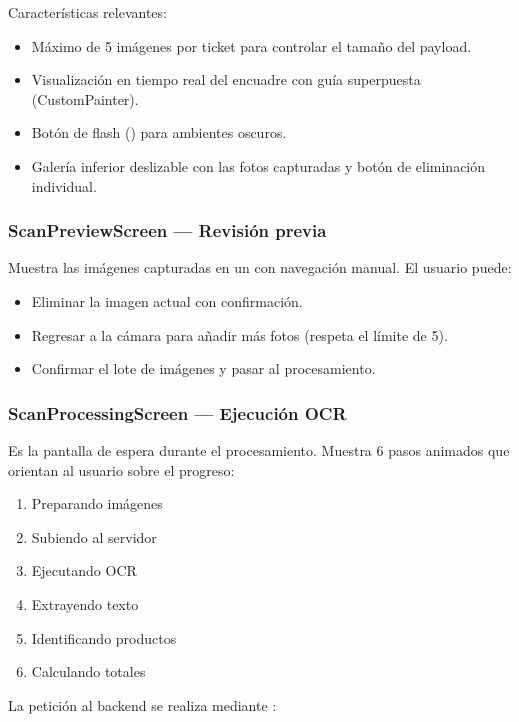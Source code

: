 Características relevantes:

\begin{itemize}
  \item Máximo de 5 imágenes por ticket para controlar el tamaño del
        payload.
  \item Visualización en tiempo real del encuadre con guía superpuesta
        (CustomPainter).
  \item Botón de flash () para ambientes oscuros.
  \item Galería inferior deslizable con las fotos capturadas y botón de
        eliminación individual.
\end{itemize}

\subsubsection*{ScanPreviewScreen — Revisión previa}

Muestra las imágenes capturadas en un  con navegación
manual. El usuario puede:

\begin{itemize}
  \item Eliminar la imagen actual con confirmación.
  \item Regresar a la cámara para añadir más fotos (respeta el límite
        de 5).
  \item Confirmar el lote de imágenes y pasar al procesamiento.
\end{itemize}

\subsubsection*{ScanProcessingScreen — Ejecución OCR}

Es la pantalla de espera durante el procesamiento. Muestra 6 pasos
animados que orientan al usuario sobre el progreso:

\begin{enumerate}
  \item Preparando imágenes
  \item Subiendo al servidor
  \item Ejecutando OCR
  \item Extrayendo texto
  \item Identificando productos
  \item Calculando totales
\end{enumerate}

La petición al backend se realiza mediante :

